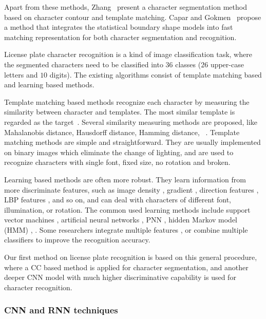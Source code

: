 \documentclass[twocolumn]{svjour3}
\begin{document}
Apart from these methods, Zhang\etal~\cite{Zhang2013} present a character segmentation method based on character contour and template matching. Capar and Gokmen~\cite{Capar2006} propose a method that integrates the statistical boundary shape models into fast matching representation for both character segmentation and recognition. %

License plate character recognition is a kind of image classification task, where the segmented characters need to be classified into $36$ classes ($26$ upper-case letters and $10$ digits). The existing algorithms consist of template matching based and learning based methods.

Template matching based methods recognize each character by measuring the similarity between character and templates. The most similar template is regarded as the target~\cite{Rasheed2012,Goel2013,Ko2003}. Several similarity measuring methods are proposed, like Mahalanobis distance, Hausdorff distance, Hamming distance, \etc~\cite{Du2013Automatic}. Template matching methods are simple and straightforward. They are usually implemented on binary images which eliminate the change of lighting, and are used to recognize characters with single font, fixed size, no rotation and broken.

Learning based methods are often more robust. They learn information from more discriminate features, such as image density
\cite{Jiao2009,Giannoukos2010}, gradient \cite{Llorens2005}, direction features \cite{Wen2011}, LBP features
\cite{Liu2010}, and so on, and can deal with characters of different font, illumination, or rotation.
The common used learning methods include support vector machines \cite{Wen2011}, artificial neural networks
\cite{Jiao2009}, PNN \cite{Giannoukos2006,Giannoukos2010}, hidden Markov model (HMM)
\cite{Llorens2005}, \etc. Some researchers integrate multiple features
\cite{Wen2011}, or combine multiple classifiers \cite{Sharma2014} to improve the recognition accuracy.


Our first method on license plate recognition is based on this general procedure, where a CC based method is applied for character segmentation, and another deeper CNN model with much higher discriminative capability is used for character recognition.

\subsubsection{CNN and RNN techniques}
\end{document}
